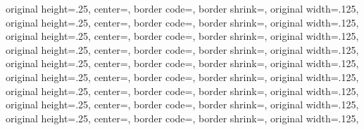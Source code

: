 {{	original height=.25\pgfpageoptionwidth,%
	center=\pgfpoint{.75\pgfphysicalwidth}{.75\pgfphysicalheight},%
	border code=\pgfsetlinewidth{.5pt}\pgfstroke,%
  }%
  {%
	border shrink=\pgfpageoptionborder,%
	original width=.125\pgfpageoptionheight,%
	original height=.25\pgfpageoptionwidth,%
	center=\pgfpoint{.5\pgfphysicalwidth}{.75\pgfphysicalheight},%
	border code=\pgfsetlinewidth{.5pt}\pgfstroke,%
	}%
  {%
	border shrink=\pgfpageoptionborder,%
	original width=.125\pgfpageoptionheight,%
	original height=.25\pgfpageoptionwidth,%
	center=\pgfpoint{.25\pgfphysicalwidth}{.75\pgfphysicalheight},%
	border code=\pgfsetlinewidth{.5pt}\pgfstroke,%
  }%
  {%
	border shrink=\pgfpageoptionborder,%
	original width=.125\pgfpageoptionheight,%
	original height=.25\pgfpageoptionwidth,%
	center=\pgfpoint{0pt}{.75\pgfphysicalheight},%
	border code=\pgfsetlinewidth{.5pt}\pgfstroke,%
  }%
  {%
	border shrink=\pgfpageoptionborder,%
	original width=.125\pgfpageoptionheight,%
	original height=.25\pgfpageoptionwidth,%
	center=\pgfpoint{.75\pgfphysicalwidth}{.625\pgfphysicalheight},%
	border code=\pgfsetlinewidth{.5pt}\pgfstroke,%
  }%
  {%
	border shrink=\pgfpageoptionborder,%
	original width=.125\pgfpageoptionheight,%
	original height=.25\pgfpageoptionwidth,%
	center=\pgfpoint{.5\pgfphysicalwidth}{.625\pgfphysicalheight},%
	border code=\pgfsetlinewidth{.5pt}\pgfstroke,%
	}%
  {%
	border shrink=\pgfpageoptionborder,%
	original width=.125\pgfpageoptionheight,%
	original height=.25\pgfpageoptionwidth,%
	center=\pgfpoint{.25\pgfphysicalwidth}{.625\pgfphysicalheight},%
	border code=\pgfsetlinewidth{.5pt}\pgfstroke,%
  }%
  {%
	border shrink=\pgfpageoptionborder,%
	original width=.125\pgfpageoptionheight,%
	original height=.25\pgfpageoptionwidth,%
	center=\pgfpoint{0pt}{.625\pgfphysicalheight},%
	border code=\pgfsetlinewidth{.5pt}\pgfstroke,%
  }%
  {%
	border shrink=\pgfpageoptionborder,%
	original width=.125\pgfpageoptionheight,%
	original height=.25\pgfpageoptionwidth,%
	center=\pgfpoint{.75\pgfphysicalwidth}{.5\pgfphysicalheight},%
	border code=\pgfsetlinewidth{.5pt}\pgfstroke,%
  }%
  {%
	border shrink=\pgfpageoptionborder,%
	original width=.125\pgfpageoptionheight,%
}}

